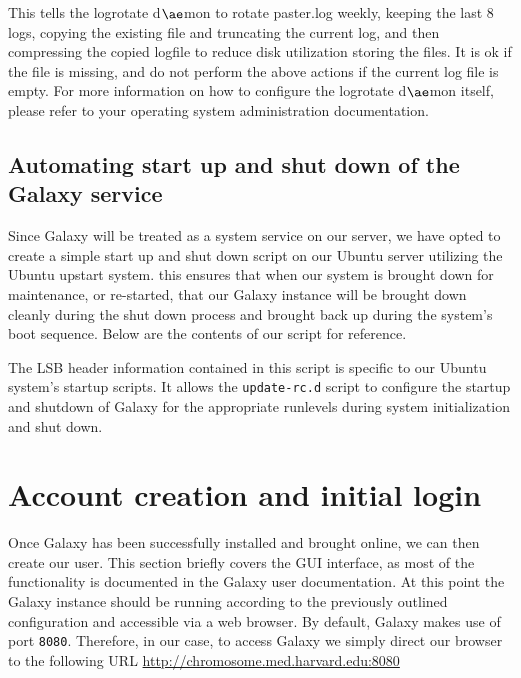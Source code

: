 \documentclass[a4paper,10pt]{article}
\begin{document}
This tells the logrotate d$\ae$mon to rotate paster.log weekly, keeping the last 8 logs, copying the existing file and truncating the current log, and then compressing the copied logfile to reduce disk utilization storing the files.  It is ok if the file is missing, and do not perform the above actions if the current log file is empty.  For more information on how to configure the logrotate d$\ae$mon itself, please refer to your operating system administration documentation.

\subsection{Automating start up and shut down of the Galaxy service}
Since Galaxy will be treated as a system service on our server, we have opted to create a simple start up and shut down script on our Ubuntu server utilizing the Ubuntu upstart system.  this ensures that when our system is brought down for maintenance, or re-started, that our Galaxy instance will be brought down cleanly during the shut down process and brought back up during the system's boot sequence.  Below are the contents of our script for reference.



The LSB header information contained in this script is specific to our Ubuntu system's startup scripts.  It allows the \texttt{\footnotesize{update-rc.d}} script to configure the startup and shutdown of Galaxy for the appropriate runlevels during system initialization and shut down.

\section{Account creation and initial login}
Once Galaxy has been successfully installed and brought online, we can then create our user.  This section briefly covers the GUI interface, as most of the functionality is documented in the Galaxy user documentation.
At this point the Galaxy instance should be running according to the previously outlined configuration and accessible via a web browser.
By default, Galaxy makes use of port \texttt{\footnotesize{8080}}. Therefore, in our case, to access Galaxy we simply direct our browser to the following URL \href{http://chromosome.med.harvard.edu:8080}{http://chromosome.med.harvard.edu:8080}
\end{document}

